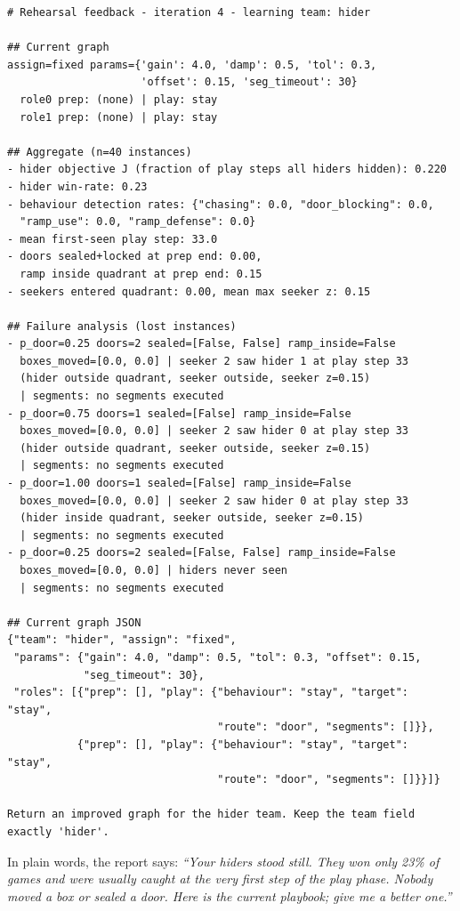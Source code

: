 \documentclass[11pt]{article}
\begin{document}
{\small
\begin{verbatim}
# Rehearsal feedback - iteration 4 - learning team: hider

## Current graph
assign=fixed params={'gain': 4.0, 'damp': 0.5, 'tol': 0.3,
                     'offset': 0.15, 'seg_timeout': 30}
  role0 prep: (none) | play: stay
  role1 prep: (none) | play: stay

## Aggregate (n=40 instances)
- hider objective J (fraction of play steps all hiders hidden): 0.220
- hider win-rate: 0.23
- behaviour detection rates: {"chasing": 0.0, "door_blocking": 0.0,
  "ramp_use": 0.0, "ramp_defense": 0.0}
- mean first-seen play step: 33.0
- doors sealed+locked at prep end: 0.00,
  ramp inside quadrant at prep end: 0.15
- seekers entered quadrant: 0.00, mean max seeker z: 0.15

## Failure analysis (lost instances)
- p_door=0.25 doors=2 sealed=[False, False] ramp_inside=False
  boxes_moved=[0.0, 0.0] | seeker 2 saw hider 1 at play step 33
  (hider outside quadrant, seeker outside, seeker z=0.15)
  | segments: no segments executed
- p_door=0.75 doors=1 sealed=[False] ramp_inside=False
  boxes_moved=[0.0, 0.0] | seeker 2 saw hider 0 at play step 33
  (hider outside quadrant, seeker outside, seeker z=0.15)
  | segments: no segments executed
- p_door=1.00 doors=1 sealed=[False] ramp_inside=False
  boxes_moved=[0.0, 0.0] | seeker 2 saw hider 0 at play step 33
  (hider inside quadrant, seeker outside, seeker z=0.15)
  | segments: no segments executed
- p_door=0.25 doors=2 sealed=[False, False] ramp_inside=False
  boxes_moved=[0.0, 0.0] | hiders never seen
  | segments: no segments executed

## Current graph JSON
{"team": "hider", "assign": "fixed",
 "params": {"gain": 4.0, "damp": 0.5, "tol": 0.3, "offset": 0.15,
            "seg_timeout": 30},
 "roles": [{"prep": [], "play": {"behaviour": "stay", "target": "stay",
                                 "route": "door", "segments": []}},
           {"prep": [], "play": {"behaviour": "stay", "target": "stay",
                                 "route": "door", "segments": []}}]}

Return an improved graph for the hider team. Keep the team field
exactly 'hider'.
\end{verbatim}
}

\noindent In plain words, the report says: \emph{``Your hiders stood still.
They won only 23\% of games and were usually caught at the very first step of
the play phase. Nobody moved a box or sealed a door. Here is the current
playbook; give me a better one.''}
\end{document}
